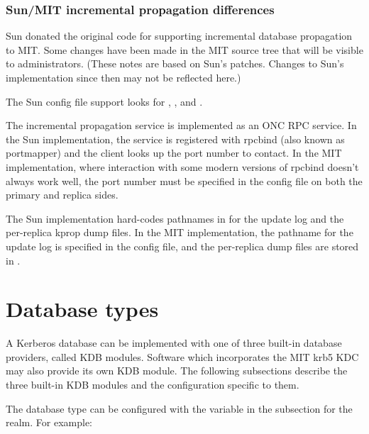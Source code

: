 \documentclass[letterpaper,10pt,english]{sphinxmanual}
\begin{document}
\subsection{Sun/MIT incremental propagation differences}
\label{\detokenize{admin/database:sun-mit-incremental-propagation-differences}}
Sun donated the original code for supporting incremental database
propagation to MIT.  Some changes have been made in the MIT source
tree that will be visible to administrators.  (These notes are based
on Sun’s patches.  Changes to Sun’s implementation since then may not
be reflected here.)

The Sun config file support looks for ,
, and .

The incremental propagation service is implemented as an ONC RPC
service.  In the Sun implementation, the service is registered with
rpcbind (also known as portmapper) and the client looks up the port
number to contact.  In the MIT implementation, where interaction with
some modern versions of rpcbind doesn’t always work well, the port
number must be specified in the config file on both the primary and
replica sides.

The Sun implementation hard-codes pathnames in  for the
update log and the per-replica kprop dump files.  In the MIT
implementation, the pathname for the update log is specified in the
config file, and the per-replica dump files are stored in
{\hyperref[\detokenize{mitK5defaults:paths}]{}}.


\chapter{Database types}
\label{\detokenize{admin/dbtypes::doc}}\label{\detokenize{admin/dbtypes:database-types}}
A Kerberos database can be implemented with one of three built-in
database providers, called KDB modules.  Software which incorporates
the MIT krb5 KDC may also provide its own KDB module.  The following
subsections describe the three built-in KDB modules and the
configuration specific to them.

The database type can be configured with the  variable
in the {\hyperref[\detokenize{admin/conf_files/kdc_conf:dbmodules}]{}} subsection for the realm.  For example:
\end{document}
